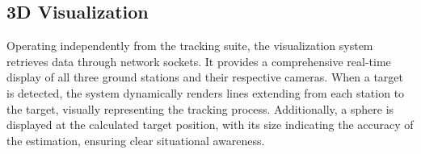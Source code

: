 

\subsection{3D Visualization}
Operating independently from the tracking suite, the visualization system retrieves data through network sockets. It provides a comprehensive real-time display of all three ground stations and their respective cameras. When a target is detected, the system dynamically renders lines extending from each station to the target, visually representing the tracking process. Additionally, a sphere is displayed at the calculated target position, with its size indicating the accuracy of the estimation, ensuring clear situational awareness.
